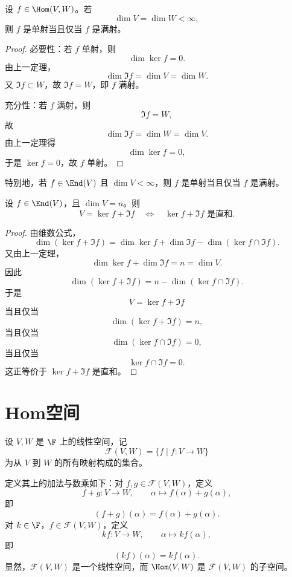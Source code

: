 \begin{corollary}
	设 $f\in\Hom(V,W)$。若
	\[
	\dim V=\dim W<\infty,
	\]
	则 $f$ 是单射当且仅当 $f$ 是满射。
\end{corollary}

\begin{proof}
	必要性：若 $f$ 单射，则
	\[
	\dim\ker f=0.
	\]
	由上一定理，
	\[
	\dim\Im f=\dim V=\dim W.
	\]
	又 $\Im f\subset W$，故 $\Im f=W$，即 $f$ 满射。
	
	充分性：若 $f$ 满射，则
	\[
	\Im f=W,
	\]
	故
	\[
	\dim\Im f=\dim W=\dim V.
	\]
	由上一定理得
	\[
	\dim\ker f=0,
	\]
	于是 $\ker f=0$，故 $f$ 单射。
\end{proof}

特别地，若 $f\in\End(V)$ 且 $\dim V<\infty$，则 $f$ 是单射当且仅当 $f$ 是满射。

\begin{proposition}
	设 $f\in\End(V)$，且 $\dim V=n$。则
	\[
	V=\ker f+\Im f
	\quad\Longleftrightarrow\quad
	\ker f+\Im f\text{ 是直和}.
	\]
\end{proposition}

\begin{proof}
	由维数公式，
	\[
	\dim(\ker f+\Im f)
	=\dim\ker f+\dim\Im f
	-\dim(\ker f\cap\Im f).
	\]
	又由上一定理，
	\[
	\dim\ker f+\dim\Im f=n=\dim V.
	\]
	因此
	\[
	\dim(\ker f+\Im f)
	=n-\dim(\ker f\cap\Im f).
	\]
	于是
	\[
	V=\ker f+\Im f
	\]
	当且仅当
	\[
	\dim(\ker f+\Im f)=n,
	\]
	当且仅当
	\[
	\dim(\ker f\cap\Im f)=0,
	\]
	当且仅当
	\[
	\ker f\cap\Im f=0.
	\]
	这正等价于 $\ker f+\Im f$ 是直和。
\end{proof}

\section{Hom空间}

\begin{definition}
	设 $V,W$ 是 $\F$ 上的线性空间，记
	\[
	\mathcal{F}(V,W)=\{f\mid f:V\longrightarrow W\}
	\]
	为从 $V$ 到 $W$ 的所有映射构成的集合。
	
	定义其上的加法与数乘如下：对 $f,g\in\mathcal{F}(V,W)$，定义
	\[
	f+g:V\longrightarrow W,
	\qquad
	\alpha\longmapsto f(\alpha)+g(\alpha),
	\]
	即
	\[
	(f+g)(\alpha)=f(\alpha)+g(\alpha).
	\]
	对 $k\in\F$，$f\in\mathcal{F}(V,W)$，定义
	\[
	kf:V\longrightarrow W,
	\qquad
	\alpha\longmapsto kf(\alpha),
	\]
	即
	\[
	(kf)(\alpha)=k f(\alpha).
	\]
	显然，$\mathcal{F}(V,W)$ 是一个线性空间，而
	$\Hom(V,W)$ 是 $\mathcal{F}(V,W)$ 的子空间。
\end{definition}

